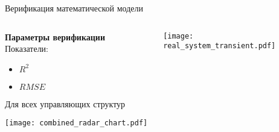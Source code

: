 \begin{frame}{Верификация математической модели}
	\begin{columns}
		\begin{column}{0.4\textwidth}
			\begin{block}{\scriptsize \textbf{Параметры верификации}}
				\scriptsize Показатели:
				\begin{itemize}
					\item \scriptsize $R^2$
					\item \scriptsize $RMSE$
				\end{itemize}
				Для всех управляющих структур
			\end{block}

			\vspace{2em}

			\scriptsize
			\texttt{[image: combined\_radar\_chart.pdf]}

		\end{column}
		\begin{column}{0.6\textwidth}
			\texttt{[image: real\_system\_transient.pdf]}

		\end{column}

	\end{columns}

\end{frame}


